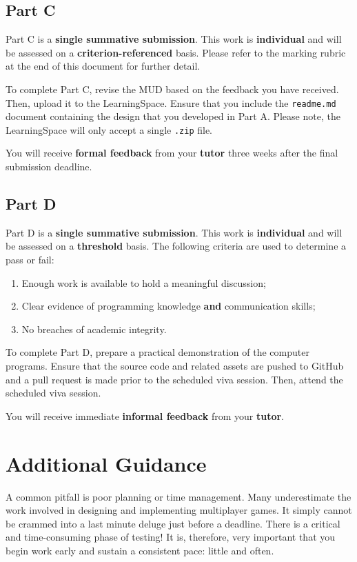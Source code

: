 \documentclass{../../fal_assignment}
\begin{document}
\subsection*{Part C}

Part C is a \textbf{single summative submission}. This work is \textbf{individual} and will be assessed on a \textbf{criterion-referenced} basis. Please refer to the marking rubric at the end of this document for further detail.

To complete Part C, revise the MUD based on the feedback you have received. Then, upload it to the LearningSpace. Ensure that you include the \texttt{readme.md} document containing the design that you developed in Part A. Please note, the LearningSpace will only accept a single \texttt{.zip} file.

You will receive \textbf{formal feedback} from your \textbf{tutor} three weeks after the final submission deadline.

\subsection*{Part D}

Part D is a \textbf{single summative submission}. This work is \textbf{individual} and will be assessed on a \textbf{threshold} basis.  The following criteria are used to determine a pass or fail:

\begin{enumerate}[label=(\alph*)]
	\item Enough work is available to hold a meaningful discussion;
	\item Clear evidence of programming knowledge \textbf{and} communication skills;
	\item No breaches of academic integrity.
\end{enumerate}

To complete Part D, prepare a practical demonstration of the computer programs. Ensure that the source code and related assets are pushed to GitHub and a pull request is made prior to the scheduled viva session. Then, attend the scheduled viva session.

You will receive immediate \textbf{informal feedback} from your \textbf{tutor}.

\section*{Additional Guidance}

A common pitfall is poor planning or time management. Many underestimate the work involved in designing and implementing multiplayer games. It simply cannot be crammed into a last minute deluge just before a deadline. There is a critical and time-consuming phase of testing! It is, therefore, very important that you begin work early and sustain a consistent pace: little and often.
\end{document}
